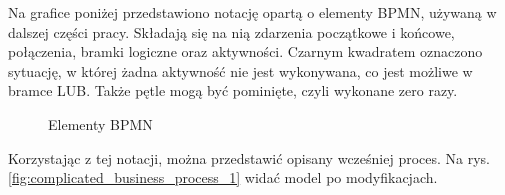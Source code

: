 Na grafice poniżej przedstawiono notację opartą o elementy BPMN, używaną w dalszej części pracy. Składają się na nią zdarzenia początkowe i końcowe, połączenia, bramki logiczne oraz aktywności. Czarnym kwadratem oznaczono sytuację, w której żadna aktywność nie jest wykonywana, co jest możliwe w bramce LUB. Także pętle mogą być pominięte, czyli wykonane zero razy.

\begin{figure}[H]
	\caption{\label{fig:bpmn_example}Elementy BPMN}
	\label{fig:lifecycle}
\end{figure}

Korzystając z tej notacji, można przedstawić opisany wcześniej proces. Na rys.  \ref{fig:complicated_business_process_1} widać model po modyfikacjach. 

